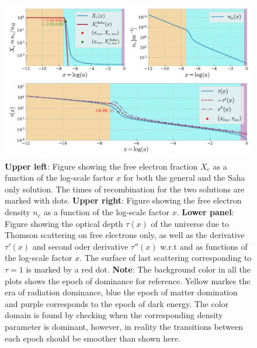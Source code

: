 \documentclass[twocolumn]{aastex62}
\begin{document}
\begin{figure}
    \includegraphics[scale = 0.65]{Figures/Xe_ne_tau.pdf}
    \caption{\textbf{Upper left}: Figure showing the free electron fraction $X_e$ 
    as a function of the log-scale factor $x$ for both the general and the Saha only solution. The times of recombination for the two solutions are marked with dots. \textbf{Upper right}: Figure showing the free electron density $n_e$
    as a function of the log-scale factor $x$. \textbf{Lower panel}: Figure showing the optical depth $\tau(x)$ of the universe due to 
    Thomson scattering on free electrons only, as well as the derivative $\tau'(x)$ and second oder derivative $\tau''(x)$ w.r.t 
    and as functions of the log-scale factor $x$. The surface of last scattering corresponding to $\tau = 1$ is marked by a red dot. \textbf{Note}: The background color in all the plots shows the epoch of dominance
    for reference. Yellow markes the era of radiation dominance, blue the epoch of matter domination
    and purple corresponds to the epoch of dark energy. The color domain is found by checking 
    when the corresponding density parameter is dominant,
    however, in reality the transitions between each epoch should be smoother than shown here.}
    \label{fig:Xe}
\end{figure}
\end{document}
